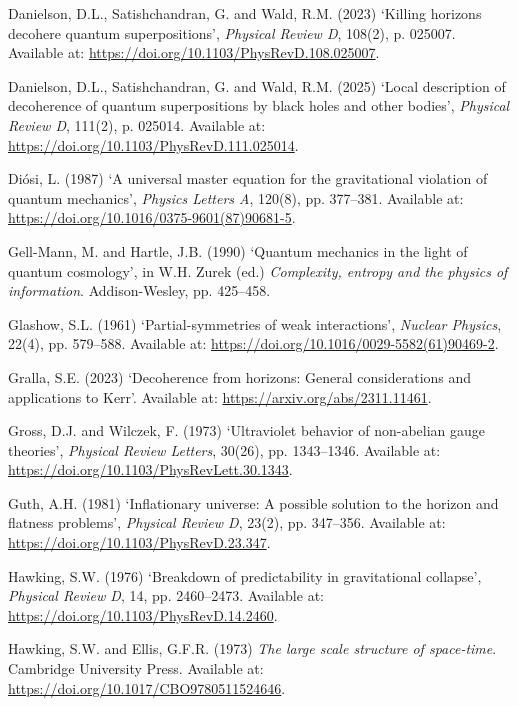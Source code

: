 \documentclass[
]{article}
\newlength{\cslhangindent}
\newenvironment{CSLReferences}[2] %
 {\begin{list}{}{%
  \setlength{\itemindent}{0pt}
  \setlength{\leftmargin}{0pt}
  \setlength{\parsep}{0pt}
  \ifodd #1
   \setlength{\leftmargin}{\cslhangindent}
   \setlength{\itemindent}{-1\cslhangindent}
  \fi
  \setlength{\itemsep}{#2\baselineskip}}}
 {\end{list}}
\begin{document}
\begin{CSLReferences}{0}{1}
Danielson, D.L., Satishchandran, G. and Wald, R.M. (2023) {`Killing
horizons decohere quantum superpositions'}, \emph{Physical Review D},
108(2), p. 025007. Available at:
\url{https://doi.org/10.1103/PhysRevD.108.025007}.

Danielson, D.L., Satishchandran, G. and Wald, R.M. (2025) {`Local
description of decoherence of quantum superpositions by black holes and
other bodies'}, \emph{Physical Review D}, 111(2), p. 025014. Available
at: \url{https://doi.org/10.1103/PhysRevD.111.025014}.

Diósi, L. (1987) {`A universal master equation for the gravitational
violation of quantum mechanics'}, \emph{Physics Letters A}, 120(8), pp.
377--381. Available at:
\url{https://doi.org/10.1016/0375-9601(87)90681-5}.

Gell-Mann, M. and Hartle, J.B. (1990) {`Quantum mechanics in the light
of quantum cosmology'}, in W.H. Zurek (ed.) \emph{Complexity, entropy
and the physics of information}. Addison-Wesley, pp. 425--458.

Glashow, S.L. (1961) {`Partial-symmetries of weak interactions'},
\emph{Nuclear Physics}, 22(4), pp. 579--588. Available at:
\url{https://doi.org/10.1016/0029-5582(61)90469-2}.

Gralla, S.E. (2023) {`Decoherence from horizons: General considerations
and applications to {Kerr}'}. Available at:
\url{https://arxiv.org/abs/2311.11461}.

Gross, D.J. and Wilczek, F. (1973) {`Ultraviolet behavior of non-abelian
gauge theories'}, \emph{Physical Review Letters}, 30(26), pp.
1343--1346. Available at:
\url{https://doi.org/10.1103/PhysRevLett.30.1343}.

Guth, A.H. (1981) {`Inflationary universe: A possible solution to the
horizon and flatness problems'}, \emph{Physical Review D}, 23(2), pp.
347--356. Available at: \url{https://doi.org/10.1103/PhysRevD.23.347}.

Hawking, S.W. (1976) {`Breakdown of predictability in gravitational
collapse'}, \emph{Physical Review D}, 14, pp. 2460--2473. Available at:
\url{https://doi.org/10.1103/PhysRevD.14.2460}.

Hawking, S.W. and Ellis, G.F.R. (1973) \emph{The large scale structure
of space-time}. Cambridge University Press. Available at:
\url{https://doi.org/10.1017/CBO9780511524646}.


\end{CSLReferences}
\end{document}
